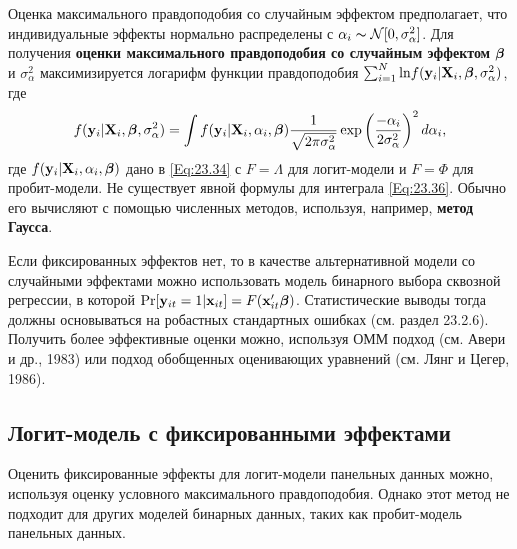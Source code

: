 Оценка максимального правдоподобия со случайным эффектом предполагает, что индивидуальные эффекты нормально распределены с $\alpha_i \thicksim \mathcal{N} [0, \sigma^2_{\alpha}]$. Для получения \textbf{оценки максимального правдоподобия со случайным эффектом} $\bm{\beta}$ и $\sigma^2_{\alpha}$ максимизируется логарифм функции правдоподобия $\sum^N_{i=1} \mathrm{ln} f(\mathbf{y}_i|\mathbf{X}_i, \bm{\beta}, \sigma^2_{\alpha})$, где 
\begin{align}
f(\mathbf{y}_i|\mathbf{X}_i, \bm{\beta}, \sigma^2_{\alpha}) = \int f(\mathbf{y}_i|\mathbf{X}_i, \alpha_i, \bm{\beta}) \frac{1}{\sqrt{2 \pi \sigma^2_{\alpha}}} \exp  \left( \frac{-\alpha_i}{2\sigma^2_{\alpha}} \right) ^2 d \alpha_i,
\label{Eq:23.36}
\end{align}
где $f(\mathbf{y}_i|\mathbf{X}_i, \alpha_i, \bm{\beta})$ дано в \ref{Eq:23.34} с $F=\Lambda$ для логит-модели и $F=\Phi$ для пробит-модели. Не существует явной формулы для интеграла \ref{Eq:23.36}. Обычно его вычисляют с помощью численных методов, используя, например, \textbf{метод Гаусса}.

Если фиксированных эффектов нет, то в качестве альтернативной модели со случайными эффектами  можно использовать модель бинарного выбора сквозной регрессии, в которой $\mathrm{Pr}  [\mathbf{y}_{it}=1|\mathbf{x}_{it}]=F(\mathbf{x}'_{it}\bm{\beta})$. Статистические выводы тогда должны основываться на робастных стандартных ошибках (см. раздел 23.2.6). Получить более эффективные оценки можно, используя ОММ подход (см. Авери и др., 1983) или подход обобщенных оценивающих уравнений (см. Лянг и Цегер, 1986).

\subsection{Логит-модель с фиксированными эффектами}

Оценить фиксированные эффекты для логит-модели панельных данных можно, используя оценку условного максимального правдоподобия. Однако этот метод не подходит для других моделей бинарных данных, таких как пробит-модель панельных данных.

